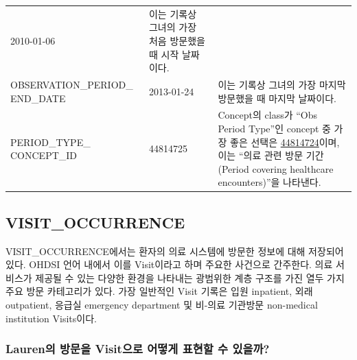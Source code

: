 \documentclass[10.5pt]{book}
\theoremstyle{definition}
\theoremstyle{definition}
\theoremstyle{definition}
\theoremstyle{remark}
\begin{document}
\begin{longtable}[]{@{}lll@{}}
\begin{minipage}[t]{0.14\columnwidth}
2010-01-06\strut
\end{minipage} & \begin{minipage}[t]{0.48\columnwidth}\raggedright\strut
이는 기록상 그녀의 가장 처음 방문했을 때 시작 날짜이다.\strut
\end{minipage}\tabularnewline
\begin{minipage}[t]{0.29\columnwidth}\raggedright\strut
OBSERVATION\_PERIOD\_ END\_DATE\strut
\end{minipage} & \begin{minipage}[t]{0.14\columnwidth}\raggedright\strut
2013-01-24\strut
\end{minipage} & \begin{minipage}[t]{0.48\columnwidth}\raggedright\strut
이는 기록상 그녀의 가장 마지막 방문했을 때 마지막 날짜이다.\strut
\end{minipage}\tabularnewline
\begin{minipage}[t]{0.29\columnwidth}\raggedright\strut
PERIOD\_TYPE\_ CONCEPT\_ID\strut
\end{minipage} & \begin{minipage}[t]{0.14\columnwidth}\raggedright\strut
44814725\strut
\end{minipage} & \begin{minipage}[t]{0.48\columnwidth}\raggedright\strut
Concept의 class가 ``Obs Period Type''인 concept 중 가장 좋은 선택은
\href{http://athena.ohdsi.org/search-terms/terms/44814724}{44814724}이며,
이는 ``의료 관련 방문 기간(Period covering healthcare encounters)''을
나타낸다.\strut
\end{minipage}\tabularnewline
\bottomrule
\end{longtable}

\subsection{VISIT\_OCCURRENCE}\label{visitOccurrence}

VISIT\_OCCURRENCE에서는 환자의 의료 시스템에 방문한 정보에 대해 저장되어
있다. OHDSI 언어 내에서 이를 Visit이라고 하며 주요한 사건으로 간주한다.
의료 서비스가 제공될 수 있는 다양한 환경을 나타내는 광범위한 계층 구조를
가진 열두 가지 주요 방문 카테고리가 있다. 가장 일반적인 Visit 기록은
입원 inpatient, 외래 outpatient, 응급실 emergency department 및 비-의료
기관방문 non-medical institution Visits이다.

\subsubsection*{Lauren의 방문을 Visit으로 어떻게 표현할 수
있을까?}\label{lauren--visit----}
\end{document}
